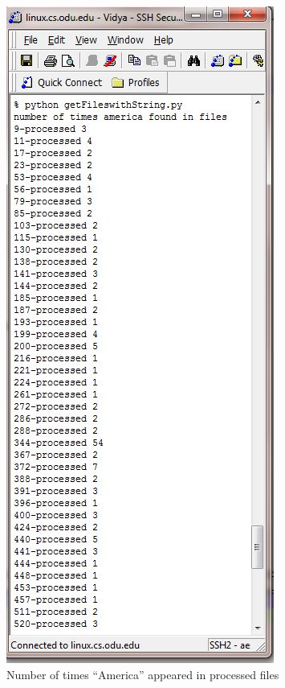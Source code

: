 \newpage
\begin{figure}[h!]
\begin{center}
\includegraphics[scale=0.55, keepaspectratio=true]{figures/america.JPG}
\caption{Number of times ``America'' appeared in processed files}
\label{fig:q2fig1}
\end{center}
\end{figure}


